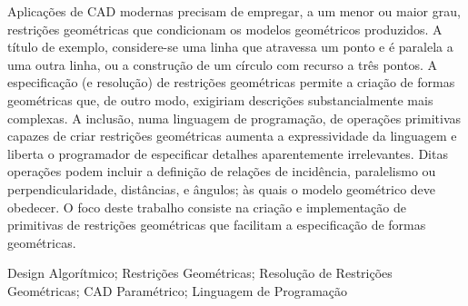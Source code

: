 \begin{resumo}
Aplicações de \acl{CAD} modernas precisam de empregar, a um menor ou maior grau,
restrições geométricas que condicionam os modelos geométricos produzidos.  A
título de exemplo, considere-se uma linha que atravessa um ponto e é paralela a
uma outra linha, ou a construção de um círculo com recurso a três pontos.  A
especificação (e resolução) de restrições geométricas permite a criação de
formas geométricas que, de outro modo, exigiriam descrições substancialmente
mais complexas.  A inclusão, numa linguagem de programação, de operações
primitivas capazes de criar restrições geométricas aumenta a expressividade da
linguagem e liberta o programador de especificar detalhes aparentemente
irrelevantes.  Ditas operações podem incluir a definição de relações de
incidência, paralelismo ou perpendicularidade, distâncias, e ângulos; às quais o
modelo geométrico deve obedecer.  O foco deste trabalho consiste na criação e
implementação de primitivas de restrições geométricas que facilitam a
especificação de formas geométricas.
\end{resumo}

\begin{palavraschave}
\noindent
Design Algorítmico;
Restrições Geométricas;
Resolução de Restrições Geométricas;
\acs{CAD} Paramétrico;
Linguagem de Programação
\end{palavraschave}

\clearpage
\thispagestyle{empty}
